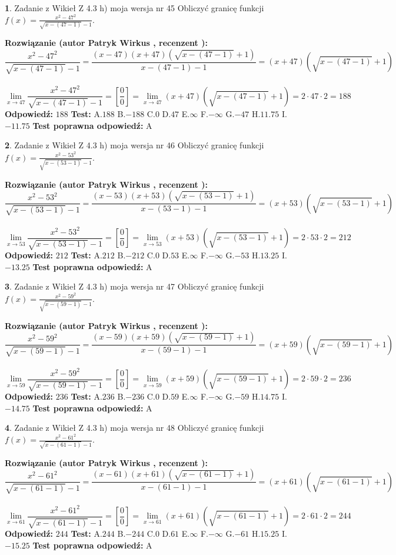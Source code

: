 \documentclass[12pt, a4paper]{article}
\theoremstyle{definition} %
\newtheorem{zad}{}
\newcommand{\zadStart}[1]{\begin{zad}#1\newline}
\newcommand{\zadStop}{\end{zad}}
\newcommand{\rozwStart}[2]{\noindent \textbf{Rozwiązanie (autor #1 , recenzent #2): }\newline}
\newcommand{\rozwStop}{\newline}
\newcommand{\odpStart}{\noindent \textbf{Odpowiedź:}\newline}
\newcommand{\odpStop}{\newline}
\newcommand{\testStart}{\noindent \textbf{Test:}\newline}
\newcommand{\testStop}{\newline}
\newcommand{\kluczStart}{\noindent \textbf{Test poprawna odpowiedź:}\newline}
\newcommand{\kluczStop}{\newline}
\begin{document}
\zadStart{Zadanie z Wikieł Z 4.3 h) moja wersja nr 45}
Obliczyć granicę funkcji $f(x)=\frac{x^{2} - 47^{2}}{\sqrt{x-(47-1)}-1}$.
\zadStop
\rozwStart{Patryk Wirkus}{}
$$\frac{x^{2} - 47^{2}}{\sqrt{x-(47-1)}-1}=\frac{(x-47)(x+47)(\sqrt{x-(47-1)}+1)}{x-(47-1)-1}=(x+47)(\sqrt{x-(47-1)}+1)$$
\\
$$\lim\limits_{x\to 47}\frac{x^{2} - 47^{2}}{\sqrt{x-(47-1)}-1}=[\frac{0}{0}]=
\lim\limits_{x\to 47}(x+47)(\sqrt{x-(47-1)}+1) = 2\cdot47 \cdot 2 = 188$$
\rozwStop
\odpStart
$188$
\odpStop
\testStart
A.$188$
B.$-188$
C.$0$
D.$47$
E.$\infty$
F.$-\infty$
G.$-47$
H.$11.75$
I.$-11.75$
\testStop
\kluczStart
A
\kluczStop



\zadStart{Zadanie z Wikieł Z 4.3 h) moja wersja nr 46}
Obliczyć granicę funkcji $f(x)=\frac{x^{2} - 53^{2}}{\sqrt{x-(53-1)}-1}$.
\zadStop
\rozwStart{Patryk Wirkus}{}
$$\frac{x^{2} - 53^{2}}{\sqrt{x-(53-1)}-1}=\frac{(x-53)(x+53)(\sqrt{x-(53-1)}+1)}{x-(53-1)-1}=(x+53)(\sqrt{x-(53-1)}+1)$$
\\
$$\lim\limits_{x\to 53}\frac{x^{2} - 53^{2}}{\sqrt{x-(53-1)}-1}=[\frac{0}{0}]=
\lim\limits_{x\to 53}(x+53)(\sqrt{x-(53-1)}+1) = 2\cdot53 \cdot 2 = 212$$
\rozwStop
\odpStart
$212$
\odpStop
\testStart
A.$212$
B.$-212$
C.$0$
D.$53$
E.$\infty$
F.$-\infty$
G.$-53$
H.$13.25$
I.$-13.25$
\testStop
\kluczStart
A
\kluczStop



\zadStart{Zadanie z Wikieł Z 4.3 h) moja wersja nr 47}
Obliczyć granicę funkcji $f(x)=\frac{x^{2} - 59^{2}}{\sqrt{x-(59-1)}-1}$.
\zadStop
\rozwStart{Patryk Wirkus}{}
$$\frac{x^{2} - 59^{2}}{\sqrt{x-(59-1)}-1}=\frac{(x-59)(x+59)(\sqrt{x-(59-1)}+1)}{x-(59-1)-1}=(x+59)(\sqrt{x-(59-1)}+1)$$
\\
$$\lim\limits_{x\to 59}\frac{x^{2} - 59^{2}}{\sqrt{x-(59-1)}-1}=[\frac{0}{0}]=
\lim\limits_{x\to 59}(x+59)(\sqrt{x-(59-1)}+1) = 2\cdot59 \cdot 2 = 236$$
\rozwStop
\odpStart
$236$
\odpStop
\testStart
A.$236$
B.$-236$
C.$0$
D.$59$
E.$\infty$
F.$-\infty$
G.$-59$
H.$14.75$
I.$-14.75$
\testStop
\kluczStart
A
\kluczStop



\zadStart{Zadanie z Wikieł Z 4.3 h) moja wersja nr 48}
Obliczyć granicę funkcji $f(x)=\frac{x^{2} - 61^{2}}{\sqrt{x-(61-1)}-1}$.
\zadStop
\rozwStart{Patryk Wirkus}{}
$$\frac{x^{2} - 61^{2}}{\sqrt{x-(61-1)}-1}=\frac{(x-61)(x+61)(\sqrt{x-(61-1)}+1)}{x-(61-1)-1}=(x+61)(\sqrt{x-(61-1)}+1)$$
\\
$$\lim\limits_{x\to 61}\frac{x^{2} - 61^{2}}{\sqrt{x-(61-1)}-1}=[\frac{0}{0}]=
\lim\limits_{x\to 61}(x+61)(\sqrt{x-(61-1)}+1) = 2\cdot61 \cdot 2 = 244$$
\rozwStop
\odpStart
$244$
\odpStop
\testStart
A.$244$
B.$-244$
C.$0$
D.$61$
E.$\infty$
F.$-\infty$
G.$-61$
H.$15.25$
I.$-15.25$
\testStop
\kluczStart
A
\kluczStop
\end{document}
